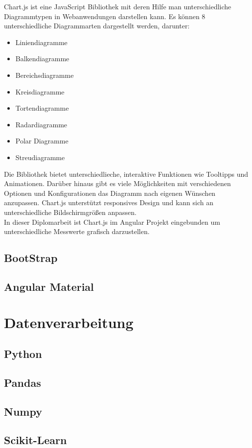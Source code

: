 \documentclass[pdftex,11pt,a4paper]{book}
\begin{document}
\text
Chart.js ist eine JavaScript Bibliothek mit deren Hilfe man unterschiedliche Diagrammtypen in Webanwendungen darstellen kann. 
Es können 8 unterschiedliche Diagrammarten dargestellt werden, darunter: 
\begin{itemize}
    \item Liniendiagramme
    \item Balkendiagramme
    \item Bereichsdiagramme
    \item Kreisdiagramme
    \item Tortendiagramme
    \item Radardiagramme
    \item Polar Diagramme
    \item Streudiagramme
\end{itemize}
Die Bibliothek bietet unterschiedlieche, interaktive Funktionen wie Tooltipps und Animationen. 
Darüber hinaus gibt es viele Möglichkeiten mit verschiedenen Optionen und Konfigurationen das Diagramm nach eigenen Wünschen  anzupassen. 
Chart.js unterstützt responsives Design und kann sich an unterschiedliche Bildschirmgrößen anpassen.\\In dieser Diplomarbeit ist Chart.js im Angular Projekt eingebunden um unterschiedliche Messwerte grafisch darzustellen.


\subsection{BootStrap}
\subsection{Angular Material}
\section{Datenverarbeitung}
\subsection{Python}
\subsection{Pandas}
\subsection{Numpy}
\subsection{Scikit-Learn}
\end{document}
